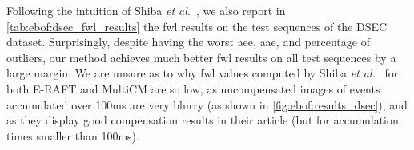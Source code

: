 \begin{table}[ht]
  \centering
  \caption{Overall results on the DSEC dataset.}\label{tab:ebof:dsec_results}
\end{table}

Following the intuition of Shiba \textit{et al.}~\cite{Shiba2022SecretsOE}, we also report in \cref{tab:ebof:dsec_fwl_results} the \acrshort{fwl} results on the test sequences of the DSEC dataset. Surprisingly, despite having the worst \acrshort{aee}, \acrshort{aae}, and percentage of outliers, our method achieves much better \acrshort{fwl} results on all test sequences by a large margin. We are unsure as to why \acrshort{fwl} values computed by Shiba \textit{et al.}~\cite{Shiba2022SecretsOE} for both E-RAFT and MultiCM are so low, as uncompensated images of events accumulated over 100ms are very blurry (as shown in \cref{fig:ebof:results_dsec}), and as they display good compensation results in their article (but for accumulation times smaller than 100ms).

